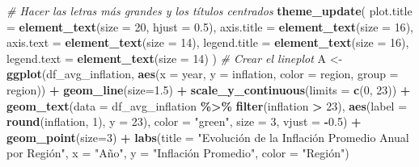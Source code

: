 \documentclass[
]{article}
\newenvironment{Shaded}{\begin{snugshade}}{\end{snugshade}}
\newcommand{\AttributeTok}[1]{\textcolor[rgb]{0.13,0.29,0.53}{#1}}
\newcommand{\CommentTok}[1]{\textcolor[rgb]{0.56,0.35,0.01}{\textit{#1}}}
\newcommand{\DecValTok}[1]{\textcolor[rgb]{0.00,0.00,0.81}{#1}}
\newcommand{\FloatTok}[1]{\textcolor[rgb]{0.00,0.00,0.81}{#1}}
\newcommand{\FunctionTok}[1]{\textcolor[rgb]{0.13,0.29,0.53}{\textbf{#1}}}
\newcommand{\NormalTok}[1]{#1}
\newcommand{\OtherTok}[1]{\textcolor[rgb]{0.56,0.35,0.01}{#1}}
\newcommand{\SpecialCharTok}[1]{\textcolor[rgb]{0.81,0.36,0.00}{\textbf{#1}}}
\newcommand{\StringTok}[1]{\textcolor[rgb]{0.31,0.60,0.02}{#1}}
\begin{document}
\begin{Shaded}
\begin{Highlighting}[]
\CommentTok{\# Hacer las letras más grandes y los títulos centrados}
\FunctionTok{theme\_update}\NormalTok{(}
    \AttributeTok{plot.title =} \FunctionTok{element\_text}\NormalTok{(}\AttributeTok{size =} \DecValTok{20}\NormalTok{, }\AttributeTok{hjust =} \FloatTok{0.5}\NormalTok{),}
    \AttributeTok{axis.title =} \FunctionTok{element\_text}\NormalTok{(}\AttributeTok{size =} \DecValTok{16}\NormalTok{),}
    \AttributeTok{axis.text =} \FunctionTok{element\_text}\NormalTok{(}\AttributeTok{size =} \DecValTok{14}\NormalTok{),}
    \AttributeTok{legend.title =} \FunctionTok{element\_text}\NormalTok{(}\AttributeTok{size =} \DecValTok{16}\NormalTok{),}
    \AttributeTok{legend.text =} \FunctionTok{element\_text}\NormalTok{(}\AttributeTok{size =} \DecValTok{14}\NormalTok{)}
\NormalTok{)}
\CommentTok{\# Crear el lineplot}
\NormalTok{A }\OtherTok{\textless{}{-}} \FunctionTok{ggplot}\NormalTok{(df\_avg\_inflation, }\FunctionTok{aes}\NormalTok{(}\AttributeTok{x =}\NormalTok{ year, }\AttributeTok{y =}\NormalTok{ inflation, }\AttributeTok{color =}\NormalTok{ region, }\AttributeTok{group =}\NormalTok{ region)) }\SpecialCharTok{+}
    \FunctionTok{geom\_line}\NormalTok{(}\AttributeTok{size=}\FloatTok{1.5}\NormalTok{) }\SpecialCharTok{+}
    \FunctionTok{scale\_y\_continuous}\NormalTok{(}\AttributeTok{limits =} \FunctionTok{c}\NormalTok{(}\DecValTok{0}\NormalTok{, }\DecValTok{23}\NormalTok{)) }\SpecialCharTok{+}
    \FunctionTok{geom\_text}\NormalTok{(}\AttributeTok{data =}\NormalTok{ df\_avg\_inflation }\SpecialCharTok{\%\textgreater{}\%} \FunctionTok{filter}\NormalTok{(inflation }\SpecialCharTok{\textgreater{}} \DecValTok{23}\NormalTok{),}
              \FunctionTok{aes}\NormalTok{(}\AttributeTok{label =} \FunctionTok{round}\NormalTok{(inflation, }\DecValTok{1}\NormalTok{), }\AttributeTok{y =} \DecValTok{23}\NormalTok{),}
              \AttributeTok{color =} \StringTok{"green"}\NormalTok{, }\AttributeTok{size =} \DecValTok{3}\NormalTok{, }\AttributeTok{vjust =} \SpecialCharTok{{-}}\FloatTok{0.5}\NormalTok{) }\SpecialCharTok{+}
    \FunctionTok{geom\_point}\NormalTok{(}\AttributeTok{size=}\DecValTok{3}\NormalTok{) }\SpecialCharTok{+}
    \FunctionTok{labs}\NormalTok{(}\AttributeTok{title =} \StringTok{"Evolución de la Inflación Promedio Anual por Región"}\NormalTok{,}
         \AttributeTok{x =} \StringTok{"Año"}\NormalTok{,}
         \AttributeTok{y =} \StringTok{"Inflación Promedio"}\NormalTok{,}
         \AttributeTok{color =} \StringTok{"Región"}\NormalTok{)}
\end{Highlighting}
\end{Shaded}
\end{document}
